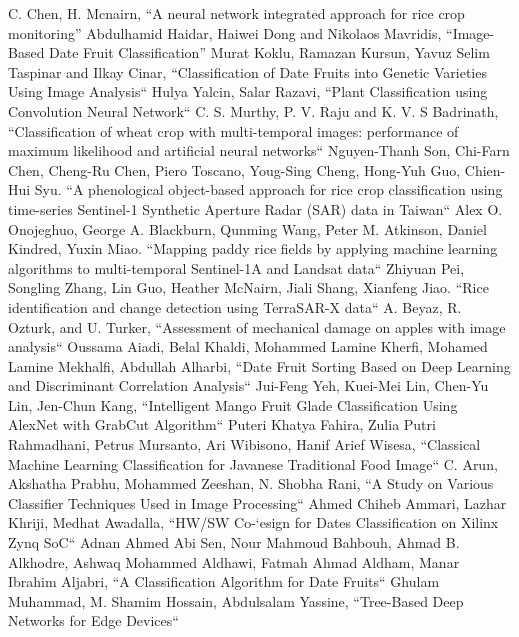 \documentclass[conference]{IEEEtran}
\begin{document}
\begin{thebibliography}{00}
 C. Chen, H. Mcnairn, ``A neural network integrated approach for rice crop monitoring''
 Abdulhamid Haidar, Haiwei Dong and Nikolaos Mavridis, ``Image-Based Date Fruit Classification''
 Murat Koklu, Ramazan Kursun, Yavuz Selim Taspinar and Ilkay Cinar, ``Classification of Date Fruits into Genetic Varieties Using Image Analysis``
 Hulya Yalcin, Salar Razavi, ``Plant Classification using Convolution Neural Network``
 C. S. Murthy, P. V. Raju and K. V. S Badrinath, ``Classification of wheat crop with multi-temporal images: performance of maximum likelihood and artificial neural networks``
 Nguyen-Thanh Son, Chi-Farn Chen, Cheng-Ru Chen, Piero Toscano, Youg-Sing Cheng, Hong-Yuh Guo, Chien-Hui Syu. ``A phenological object-based approach for rice crop classification using time-series Sentinel-1 Synthetic Aperture Radar (SAR) data in Taiwan``
 Alex O. Onojeghuo, George A. Blackburn, Qunming Wang, Peter M. Atkinson, Daniel Kindred, Yuxin Miao. ``Mapping paddy rice fields by applying machine learning algorithms to multi-temporal Sentinel-1A and Landsat data``
 Zhiyuan Pei, Songling Zhang, Lin Guo, Heather McNairn, Jiali Shang, Xianfeng Jiao. ``Rice identification and change detection using TerraSAR-X data``
 A. Beyaz, R. Ozturk, and U. Turker, ``Assessment of mechanical damage on apples with image analysis``
 Oussama Aiadi, Belal Khaldi, Mohammed Lamine Kherfi, Mohamed Lamine Mekhalfi, Abdullah Alharbi, ``Date Fruit Sorting Based on Deep Learning and Discriminant Correlation Analysis``
 Jui-Feng Yeh, Kuei-Mei Lin, Chen-Yu Lin, Jen-Chun Kang, ``Intelligent Mango Fruit Glade Classification Using AlexNet with GrabCut Algorithm``
 Puteri Khatya Fahira, Zulia Putri Rahmadhani, Petrus Mursanto, Ari Wibisono, Hanif Arief Wisesa, ``Classical Machine Learning Classification for Javanese Traditional Food Image``
 C. Arun, Akshatha Prabhu, Mohammed Zeeshan, N. Shobha Rani, ``A Study on Various Classifier Techniques Used in Image Processing``
 Ahmed Chiheb Ammari, Lazhar Khriji, Medhat Awadalla, ``HW/SW Co-‘esign for Dates Classification on Xilinx Zynq SoC``
 Adnan Ahmed Abi Sen, Nour Mahmoud Bahbouh, Ahmad B. Alkhodre, Ashwaq Mohammed Aldhawi, Fatmah Ahmad Aldham, Manar Ibrahim Aljabri, ``A Classification Algorithm for Date Fruits``
 Ghulam Muhammad, M. Shamim Hossain, Abdulsalam Yassine, ``Tree-Based Deep Networks for Edge Devices``

\end{thebibliography}
\end{document}
